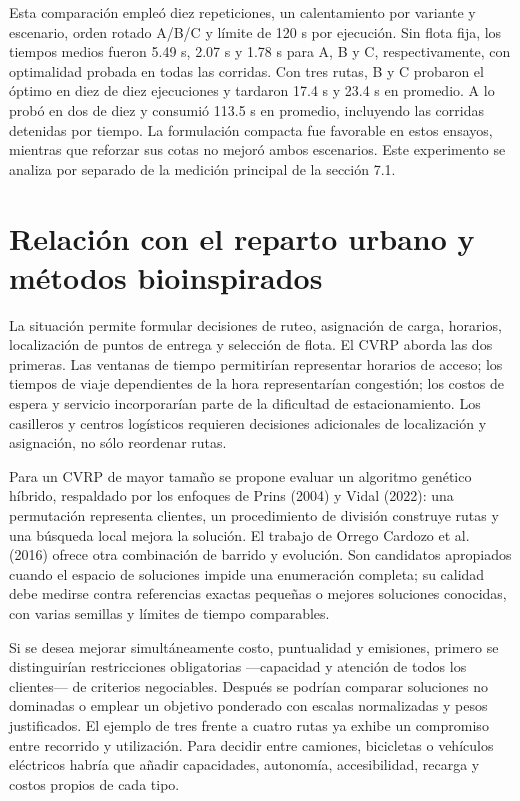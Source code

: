 \documentclass[11pt,a4paper]{article}
\numberwithin{equation}{section}
\begin{document}
Esta comparación empleó diez repeticiones, un calentamiento por variante y escenario, orden rotado A/B/C y límite de 120 s por ejecución. Sin flota fija, los tiempos medios fueron 5.49 s, 2.07 s y 1.78 s para A, B y C, respectivamente, con optimalidad probada en todas las corridas. Con tres rutas, B y C probaron el óptimo en diez de diez ejecuciones y tardaron 17.4 s y 23.4 s en promedio. A lo probó en dos de diez y consumió 113.5 s en promedio, incluyendo las corridas detenidas por tiempo. La formulación compacta fue favorable en estos ensayos, mientras que reforzar sus cotas no mejoró ambos escenarios. Este experimento se analiza por separado de la medición principal de la sección 7.1.


\Needspace{110pt}

\section{Relación con el reparto urbano y métodos bioinspirados}

La situación permite formular decisiones de ruteo, asignación de carga, horarios, localización de puntos de entrega y selección de flota. El CVRP aborda las dos primeras. Las ventanas de tiempo permitirían representar horarios de acceso; los tiempos de viaje dependientes de la hora representarían congestión; los costos de espera y servicio incorporarían parte de la dificultad de estacionamiento. Los casilleros y centros logísticos requieren decisiones adicionales de localización y asignación, no sólo reordenar rutas.


Para un CVRP de mayor tamaño se propone evaluar un algoritmo genético híbrido, respaldado por los enfoques de Prins (2004) y Vidal (2022): una permutación representa clientes, un procedimiento de división construye rutas y una búsqueda local mejora la solución. El trabajo de Orrego Cardozo et al. (2016) ofrece otra combinación de barrido y evolución. Son candidatos apropiados cuando el espacio de soluciones impide una enumeración completa; su calidad debe medirse contra referencias exactas pequeñas o mejores soluciones conocidas, con varias semillas y límites de tiempo comparables.


Si se desea mejorar simultáneamente costo, puntualidad y emisiones, primero se distinguirían restricciones obligatorias ---capacidad y atención de todos los clientes--- de criterios negociables. Después se podrían comparar soluciones no dominadas o emplear un objetivo ponderado con escalas normalizadas y pesos justificados. El ejemplo de tres frente a cuatro rutas ya exhibe un compromiso entre recorrido y utilización. Para decidir entre camiones, bicicletas o vehículos eléctricos habría que añadir capacidades, autonomía, accesibilidad, recarga y costos propios de cada tipo.
\end{document}
